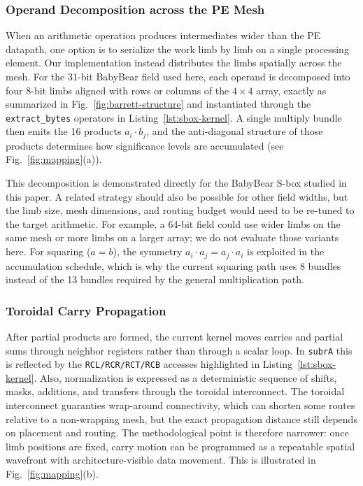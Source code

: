 \subsubsection{Operand Decomposition across the PE Mesh}
\label{subsubsec:decomposition}

When an arithmetic operation produces intermediates wider than the PE datapath, one option is to serialize the work limb by limb on a single processing element. Our implementation instead distributes the limbs spatially across the mesh. For the 31-bit BabyBear field used here, each operand is decomposed into four 8-bit limbs aligned with rows or columns of the $4\!\times\!4$ array, exactly as summarized in Fig.~\ref{fig:barrett-structure} and instantiated through the \texttt{extract\_bytes} operators in Listing~\ref{lst:sbox-kernel}. A single multiply bundle then emits the 16 products $a_i \cdot  b_j$, and the anti-diagonal structure of those products determines how significance levels are accumulated (see Fig.~\ref{fig:mapping}(a)).

This decomposition is demonstrated directly for the BabyBear S-box studied in this paper. A related strategy should also be possible for other field widths, but the limb size, mesh dimensions, and routing budget would need to be re-tuned to the target arithmetic. For example, a 64-bit field could use wider limbs on the same mesh or more limbs on a larger array; we do not evaluate those variants here. For squaring ($a = b$), the symmetry $a_i \cdot a_j = a_j \cdot a_i$ is exploited in the accumulation schedule, which is why the current squaring path uses 8 bundles instead of the 13 bundles required by the general multiplication path.

\subsubsection{Toroidal Carry Propagation}
\label{subsubsec:carry-chain}

After partial products are formed, the current kernel moves carries and partial sums through neighbor registers rather than through a scalar loop. In \texttt{subrA} this is reflected by the \texttt{RCL/RCR/RCT/RCB} accesses highlighted in Listing~\ref{lst:sbox-kernel}. Also, normalization is expressed as a deterministic sequence of shifts, masks, additions, and transfers through the toroidal interconnect. The toroidal interconnect guaranties wrap-around connectivity, which can shorten some routes relative to a non-wrapping mesh, but the exact propagation distance still depends on placement and routing. The methodological point is therefore narrower: once limb positions are fixed, carry motion can be programmed as a repeatable spatial wavefront with architecture-visible data movement. This is illustrated in Fig.~\ref{fig:mapping}(b).



